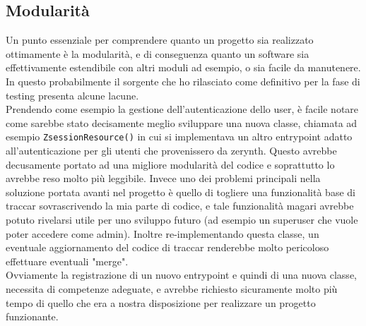 \documentclass[a4paper,titlepage,12pt]{book}
\begin{document}
\subsection{\sffamily
Modularità}
Un punto essenziale per comprendere quanto un progetto sia realizzato ottimamente è la modularità, e di conseguenza quanto un software sia effettivamente estendibile con altri moduli ad esempio, o sia facile da manutenere. In questo probabilmente il sorgente che ho rilasciato come definitivo per la fase di testing presenta alcune lacune.\\
Prendendo come esempio la gestione dell'autenticazione dello user, è facile notare come sarebbe stato decisamente meglio sviluppare una nuova classe, chiamata ad esempio \texttt{ZsessionResource()} in cui si implementava un altro entrypoint adatto all'autenticazione per gli utenti che provenissero da zerynth.  Questo avrebbe decusamente portato ad una migliore modularità del codice e soprattutto lo avrebbe reso molto più leggibile. Invece uno dei problemi principali nella soluzione portata avanti nel progetto è quello di togliere una funzionalità base di traccar sovrascrivendo la mia parte di codice, e tale funzionalità magari avrebbe potuto rivelarsi utile per uno sviluppo futuro (ad esempio un superuser che vuole poter accedere come admin). Inoltre re-implementando questa classe, un eventuale aggiornamento del codice di traccar renderebbe molto pericoloso effettuare eventuali "merge".\\
Ovviamente la registrazione di un nuovo entrypoint e quindi di una nuova classe, necessita di competenze adeguate, e avrebbe richiesto sicuramente molto più tempo di quello che era a nostra disposizione per realizzare un progetto funzionante.
\end{document}
